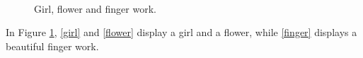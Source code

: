 \documentclass[a4paper]{article}
\begin{document}
    \begin{figure}[!htb]
    \centering
    \hfill
    \\
    \caption{Girl, flower and finger work.}
    \label{girl_flower_finger}
    \end{figure}
    In Figure \ref{girl_flower_finger}, \ref{girl}
    and \ref{flower} display a girl and a flower,
    while \ref{finger} displays a beautiful finger
    work.
\end{document}
